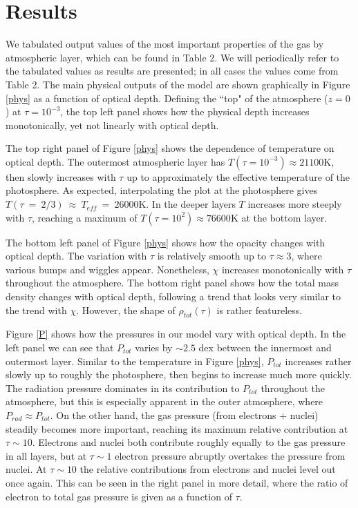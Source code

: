 \documentclass[iop,revtex4]{emulateapj}
\begin{document}
\section{Results} \label{results}
We tabulated output values of the most important properties of the gas by atmospheric layer, which can be found in Table 2. We will periodically refer to the tabulated values as results are presented; in all cases the values come from Table 2. The main physical outputs of the model are shown graphically in Figure \ref{phys} as a function of optical depth. Defining the ``top" of the atmosphere ($z=0$) at $\tau=10^{-3}$, the top left panel shows how the physical depth increases monotonically, yet not linearly with optical depth.
\par
The top right panel of Figure \ref{phys} shows the dependence of temperature on optical depth. The outermost atmospheric layer has $T(\tau=10^{-3})\approx21100$K, then slowly increases with $\tau$ up to approximately the effective temperature of the photosphere. As expected, interpolating the plot at the photosphere gives $T(\tau~=~2/3)~\approx~T_{eff}~=~26000$K. In the deeper layers $T$ increases more steeply with $\tau$, reaching a maximum of $T(\tau=10^{2})\approx76600$K at the bottom layer.
\par
The bottom left panel of Figure \ref{phys} shows how the opacity changes with optical depth. The variation with $\tau$ is relatively smooth up to $\tau\approx3$, where various bumps and wiggles appear. Nonetheless, $\chi$ increases monotonically with $\tau$ throughout the atmosphere. The bottom right panel shows how the total mass density changes with optical depth, following a trend that looks very similar to the trend with $\chi$. However, the shape of $\rho_{tot}(\tau)$ is rather featureless.
\par
Figure \ref{P} shows how the pressures in our model vary with optical depth. In the left panel we can see that $P_{tot}$ varies by $\sim 2.5$ dex between the innermost and outermost layer. Similar to the temperature in Figure \ref{phys}, $P_{tot}$ increases rather slowly up to roughly the photosphere, then begins to increase much more quickly. The radiation pressure dominates in its contribution to $P_{tot}$ throughout the atmosphere, but this is especially apparent in the outer atmosphere, where $P_{rad}\approx P_{tot}$. On the other hand, the gas pressure (from electrons + nuclei) steadily becomes more important, reaching its maximum relative contribution at $\tau\sim10$. Electrons and nuclei both contribute roughly equally to the gas pressure in all layers, but at $\tau\sim1$ electron pressure abruptly overtakes the pressure from nuclei. At $\tau\sim10$ the relative contributions from electrons and nuclei level out once again. This can be seen in the right panel in more detail, where the ratio of electron to total gas pressure is given as a function of $\tau$. 
\end{document}

